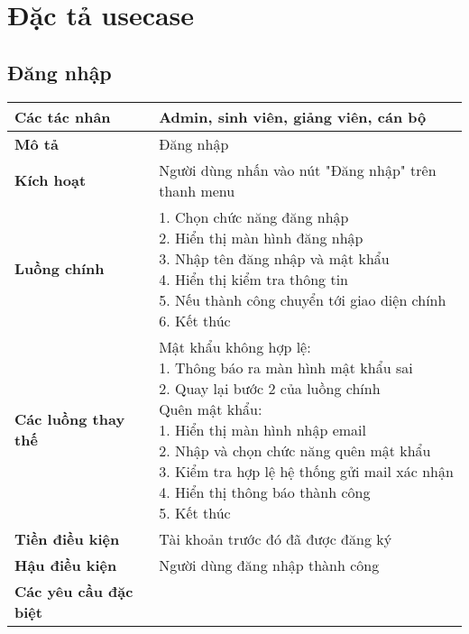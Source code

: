 \section{Đặc tả usecase}
\subsection{Đăng nhập}
	\begin{tabular}{|l|p{}|}
		\hline
		\textbf{Các tác nhân}         & Admin, sinh viên, giảng viên, cán bộ \\
		\hline
		\textbf{Mô tả}                & Đăng nhập                                           \\
		\hline
		\textbf{Kích hoạt}            & Người dùng nhấn vào nút "Đăng nhập" trên thanh menu \\
		\hline
		\textbf{Luồng chính}          & \makecell[l]{1. Chọn chức năng đăng nhập            \\ 2. Hiển thị màn hình đăng nhập \\ 3. Nhập tên đăng nhập và mật khẩu \\ 4. Hiển thị kiểm tra thông tin \\ 5. Nếu thành công chuyển tới giao diện chính \\ 6. Kết thúc} \\
		\hline
		\textbf{Các luồng thay thế}   & \makecell[l]{Mật khẩu không hợp lệ:                 \\ 1. Thông báo ra màn hình mật khẩu sai \\ 2. Quay lại bước 2 của luồng chính \\ Quên mật khẩu: \\ 1. Hiển thị màn hình nhập email \\ 2. Nhập và chọn chức năng quên mật khẩu \\ 3. Kiểm tra hợp lệ hệ thống gửi mail xác nhận \\ 4. Hiển thị thông báo thành công \\ 5. Kết thúc} \\
		\hline
		\textbf{Tiền điều kiện}       & Tài khoản trước đó đã được đăng ký                  \\
		\hline
		\textbf{Hậu điều kiện}        & Người dùng đăng nhập thành công                     \\
		\hline
		\textbf{Các yêu cầu đặc biệt} &                                                     \\
		\hline
	\end{tabular}


